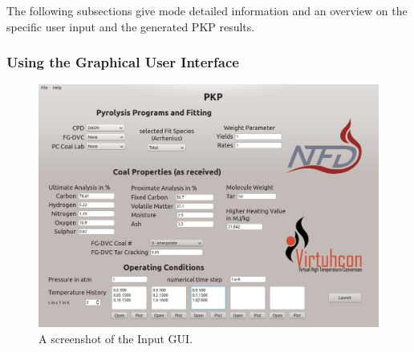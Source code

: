 The following subsections give mode detailed information and an overview on the specific user input and the generated PKP results.


\subsubsection{Using the Graphical User Interface}\label{SSS_GUI}
\begin{figure}
\centering
\includegraphics[width=14cm,angle=0]{Figures/GUI}
\caption{A screenshot of the Input GUI.}
\label{F_GUI}
\end{figure}


